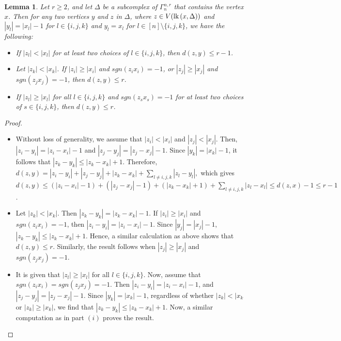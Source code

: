 \documentclass{amsart}
\newtheorem{lemma}[theorem]{Lemma}
\theoremstyle{definition}
\theoremstyle{remark}
\numberwithin{equation}{section}
\newcommand{\lk}{\mbox{\upshape lk}\,}
\newcommand{\D}{\Delta}
\begin{document}
\begin{lemma}\label{threevertex}
	Let $r\geq 2$, and let  $\D$ be  a subcomplex of $\Gamma_n^{\alpha, r}$ that contains the vertex $x$. Then for any two vertices $y$ and $z$ in $\D$, where $z\in V(\lk(x,\D))$ and  $|y_l|=|x_l|-1$ for $l\in\{i,j,k\}$ and $y_l=x_l$ for $l\in [n]\setminus\{i,j,k\}$, we have the following: 
	\begin{itemize}
		\item[(i)]  If $|z_l|<|x_l|$ for at least two choices of $l\in\{i,j,k\}$,  then $d(z,y)\leq  r-1$.
		\item[(ii)]  Let $|z_k|<|x_k|$. If $|z_i|\geq |x_i|$ and $sgn(z_ix_i)=-1$,  or $|z_j|\geq |x_j|$ and $sgn(z_jx_j)=-1$, then $d(z,y)\leq  r$.
		\item[(iii)] If $|z_l|\geq |x_l|$ for all $l\in\{i,j,k\}$ and $sgn(z_sx_s)=-1$ for at least two choices of $s\in\{i,j,k\}$, then $d(z,y)\leq r$.
	\end{itemize}
	
\end{lemma}
\begin{proof}
	\begin{itemize}
		\item[(i)] 
		Without loss of generality, we assume that $|z_i|<|x_i|$ and $|z_j|<|x_j|$. Then,  $|z_i - y_i| = |z_i - x_i| - 1$ and $|z_j - y_j| = |z_j - x_j| - 1$. 
		Since $|y_k|=|x_k|-1$, it follows that $|z_k-y_k|\leq |z_k-x_k|+1$. Therefore, $d(z,y) = |z_i - y_i| + |z_j - y_j| +|z_k-x_k|+ \sum_{l \neq i,j,k} |z_l - y_l|,$ which gives $d(z,y)\leq (|z_i - x_i| - 1) + (|z_j - x_j| - 1) + (|z_k-x_k|+1)+\sum_{l \neq i,j,k} |z_l - x_l| \leq d(z,x)-1\leq r-1$. 
		
		\item[(ii)] Let $|z_k|<|x_k|$. Then $|z_k-y_k|=|z_k-x_k|-1$. If $|z_i|\geq |x_i|$ and $sgn(z_ix_i)=-1$, then $|z_i-y_i|=|z_i-x_i|-1$. Since $|y_j|=|x_j|-1$, $|z_k-y_k|\leq |z_k-x_k|+1$. Hence, a similar calculation as above shows that $d(z,y)\leq r$. Similarly, the result follows when $|z_j|\geq |x_j|$ and $sgn(z_jx_j)=-1$. 
		
		\item[(iii)] It is given that $|z_l|\geq |x_l|$ for all $l\in\{i,j,k\}$. Now, assume that $sgn(z_ix_i)=sgn(z_jx_j)=-1$. Then $|z_i-y_i|=|z_i-x_i|-1$, and $|z_j-y_j|=|z_j-x_j|-1$. Since $|y_k|=|x_k|-1$, regardless of whether $|z_k|<|x_k$ or $|z_k|\geq |x_k|$, we find that $|z_k-y_k|\leq |z_k-x_k|+1$. 
		Now, a similar computation as in part $(i)$ proves the result.
	\end{itemize}
    \vspace{- 0.4 cm}
\end{proof}
\end{document}
